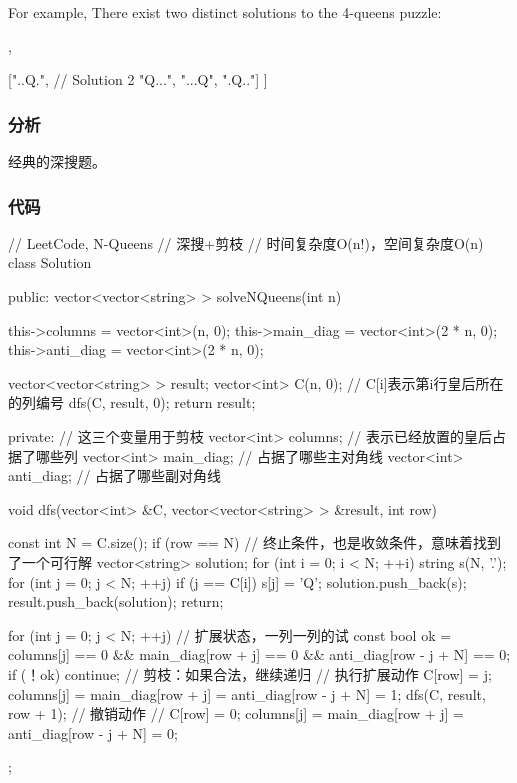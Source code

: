 For example,
There exist two distinct solutions to the 4-queens puzzle:
\begin{Code}
[
 [".Q..",  // Solution 1
  "...Q",
  "Q...",
  "..Q."],

 ["..Q.",  // Solution 2
  "Q...",
  "...Q",
  ".Q.."]
]
\end{Code}


\subsubsection{分析}
经典的深搜题。

\subsubsection{代码}
\begin{Code}
// LeetCode, N-Queens
// 深搜+剪枝
// 时间复杂度O(n!)，空间复杂度O(n)
class Solution {
public:
    vector<vector<string> > solveNQueens(int n) {
        this->columns = vector<int>(n, 0);
        this->main_diag = vector<int>(2 * n, 0);
        this->anti_diag = vector<int>(2 * n, 0);

        vector<vector<string> > result;
        vector<int> C(n, 0);  // C[i]表示第i行皇后所在的列编号
        dfs(C, result, 0);
        return result;
    }
private:
    // 这三个变量用于剪枝
    vector<int> columns;  // 表示已经放置的皇后占据了哪些列
    vector<int> main_diag;  // 占据了哪些主对角线
    vector<int> anti_diag;  // 占据了哪些副对角线

    void dfs(vector<int> &C, vector<vector<string> > &result, int row) {
        const int N = C.size();
        if (row == N) { // 终止条件，也是收敛条件，意味着找到了一个可行解
            vector<string> solution;
            for (int i = 0; i < N; ++i) {
                string s(N, '.');
                for (int j = 0; j < N; ++j) {
                    if (j == C[i]) s[j] = 'Q';
                }
                solution.push_back(s);
            }
            result.push_back(solution);
            return;
        }

        for (int j = 0; j < N; ++j) {  // 扩展状态，一列一列的试
            const bool ok = columns[j] == 0 && main_diag[row + j] == 0 &&
                    anti_diag[row - j + N] == 0;
            if (！ok) continue;  // 剪枝：如果合法，继续递归
            // 执行扩展动作
            C[row] = j;
            columns[j] = main_diag[row + j] = anti_diag[row - j + N] = 1;
            dfs(C, result, row + 1);
            // 撤销动作
            // C[row] = 0;
            columns[j] = main_diag[row + j] = anti_diag[row - j + N] = 0;
        }
    }
};
\end{Code}


